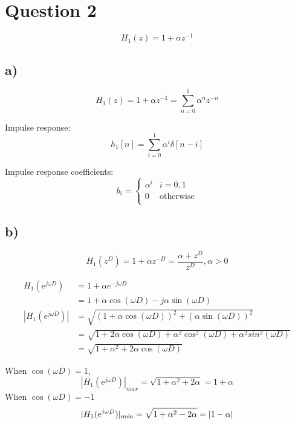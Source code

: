 \documentclass{article}
\newenvironment{homeworkProblem}[1]{
	\section*{#1}
	}{
}
\newenvironment{homeworkSection}[1]{
	\subsection*{#1}
	}{
}
\begin{document}
\begin{homeworkProblem}{Question 2}

\begin{equation}\label{A21}
H_1(z) = 1 + \alpha z^{-1}
\end{equation}

\begin{homeworkSection}{a)}

\begin{equation}\label{A2a1}
H_1(z) = 1 + \alpha z^{-1} = \sum_{n=0}^{1}\alpha^{n}z^{-n}
\end{equation}

Impulse response:
\begin{equation}\label{A2a2}
h_1[n] = \sum_{i=0}^{1}\alpha^{i}\delta[n-i]
\end{equation}

Impulse response coefficients:
\begin{equation}\label{A2a3}
b_i=
\begin{cases} \alpha^i & i=0, 1\\ 0 & \text{otherwise}\\ \end{cases}
\end{equation}

\end{homeworkSection}


\begin{homeworkSection}{b)}

\begin{equation}\label{A2b1}
H_1(z^D) = 1 + \alpha z^{-D} = \frac{\alpha+z^D}{z^D}, \alpha > 0
\end{equation}

\begin{align*}
H_1(e^{j\omega D}) &= 1 + \alpha e^{-j\omega D}\\
&= 1 + \alpha \cos(\omega D) - j \alpha \sin(\omega D)\\
|H_1(e^{j\omega D})| &= \sqrt{(1 + \alpha \cos(\omega D))^2 + (\alpha \sin(\omega D))^2}\\
&= \sqrt{1 + 2 \alpha \cos(\omega D) + \alpha^2 \cos^2(\omega D) + \alpha^2 sin^2(\omega D)}\\
&= \sqrt{1 + \alpha^2 + 2 \alpha \cos(\omega D)}
\end{align*}

When $\cos(\omega D)=1$,
\begin{equation}\label{A2b2}
|H_1(e^{j\omega D})|_{max} = \sqrt{1 + \alpha^2 + 2 \alpha} = 1 + \alpha
\end{equation}
When $\cos(\omega D)=-1$
\begin{equation}\label{A2b3}
|H_1(e^{j\omega D})|_{min} = \sqrt{1 + \alpha^2 - 2 \alpha} = |1 - \alpha|\\
\end{equation}


\end{homeworkSection}
\end{homeworkProblem}
\end{document}
